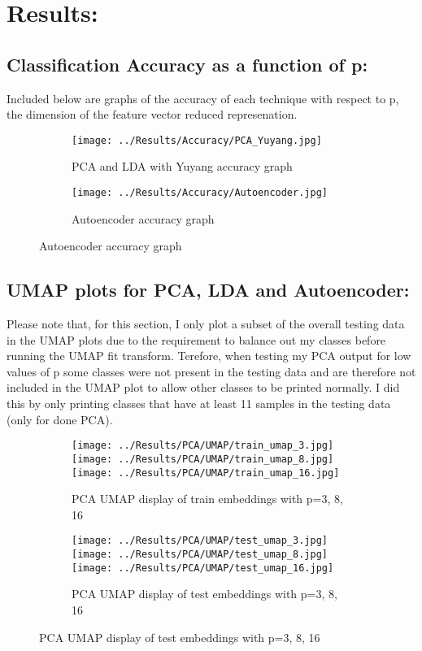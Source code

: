 \documentclass{article}
\begin{document}
\section{Results:}
\subsection{Classification Accuracy as a function of p:}
Included below are graphs of the accuracy of each technique with respect to p, the dimension of the feature vector reduced represenation.

\begin{figure}[H]
    \centering
    \begin{subfigure}{0.49\linewidth}
        \centering
        \texttt{[image: ../Results/Accuracy/PCA\_Yuyang.jpg]}
        \caption{PCA and LDA with Yuyang accuracy graph}
    \end{subfigure}
    \begin{subfigure}{0.49\linewidth}
        \centering
        \texttt{[image: ../Results/Accuracy/Autoencoder.jpg]}
        \caption{Autoencoder accuracy graph}
    \end{subfigure}
\end{figure}

\subsection{UMAP plots for PCA, LDA and Autoencoder:}
Please note that, for this section, I only plot a subset of the overall testing data in the UMAP plots due to the requirement to balance out my classes before running the UMAP fit transform. Terefore, when testing my PCA output for low values of p some classes were not present in the testing data and are therefore not included in the UMAP plot to allow other classes to be printed normally. I did this by only printing classes that have at least 11 samples in the testing data (only for done PCA). 

\begin{figure}[H]
    \centering
    \begin{subfigure}{\linewidth}
        \centering
        \texttt{[image: ../Results/PCA/UMAP/train\_umap\_3.jpg]}
        \texttt{[image: ../Results/PCA/UMAP/train\_umap\_8.jpg]}
        \texttt{[image: ../Results/PCA/UMAP/train\_umap\_16.jpg]}
        \caption{PCA UMAP display of train embeddings with p=3, 8, 16}
    \end{subfigure}
    \begin{subfigure}{\linewidth}
        \centering
        \texttt{[image: ../Results/PCA/UMAP/test\_umap\_3.jpg]}
        \texttt{[image: ../Results/PCA/UMAP/test\_umap\_8.jpg]}
        \texttt{[image: ../Results/PCA/UMAP/test\_umap\_16.jpg]}
        \caption{PCA UMAP display of test embeddings with p=3, 8, 16}
    \end{subfigure}
\end{figure}
\end{document}
